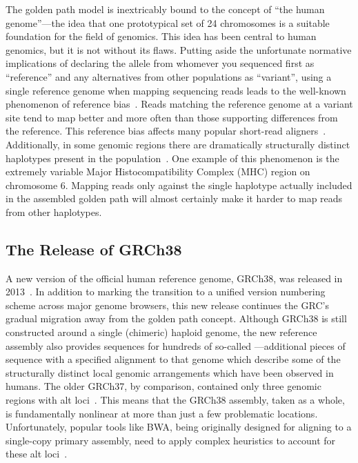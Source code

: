 The golden path model is inextricably bound to the concept of ``the human genome''---the idea that one prototypical set of 24 chromosomes is a suitable foundation for the field of genomics. This idea has been central to human genomics, but it is not without its flaws. Putting aside the unfortunate normative implications of declaring the allele from whomever you sequenced first as ``reference'' and any alternatives from other populations as ``variant'', using a single reference genome when mapping sequencing reads leads to the well-known phenomenon of reference bias~\cite{degner2009effect,brandt2015mapping}. Reads matching the reference genome at a variant site tend to map better and more often than those supporting differences from the reference. This reference bias affects many popular short-read aligners~\cite{lunter2011stampy}. Additionally, in some genomic regions there are dramatically structurally distinct haplotypes present in the population~\cite{church2011modernizing}. One example of this phenomenon is the extremely variable Major Histocompatibility Complex (MHC) region on chromosome 6. Mapping reads only against the single haplotype actually included in the assembled golden path will almost certainly make it harder to map reads from other haplotypes.

\subsection{The Release of GRCh38}

A new version of the official human reference genome, GRCh38, was released in 2013~\cite{grc2013announcing}. In addition to marking the transition to a unified version numbering scheme across major genome browsers, this new release continues the GRC's gradual migration away from the golden path concept. Although GRCh38 is still constructed around a single (chimeric) haploid genome, the new reference assembly also provides sequences for hundreds of so-called ---additional pieces of sequence with a specified alignment to that genome which describe some of the structurally distinct local genomic arrangements which have been observed in humans. The older GRCh37, by comparison, contained only three genomic regions with alt loci~\cite{church2011modernizing}. This means that the GRCh38 assembly, taken as a whole, is fundamentally nonlinear at more than just a few problematic locations. Unfortunately, popular tools like BWA, being originally designed for aligning to a single-copy primary assembly, need to apply complex heuristics to account for these alt loci~\cite{li2014bwa,li2014new}.

